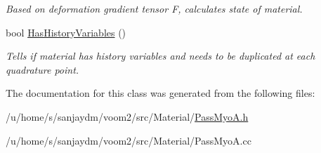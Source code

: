 \begin{DoxyCompactItemize}
\begin{DoxyCompactList}\small\item\em Based on deformation gradient tensor F, calculates state of material. \item\end{DoxyCompactList}\item 
\hypertarget{classvoom_1_1_pass_myo_a_a06cf31fdeb3e84c3aa7553928bcf3b01}{
bool \hyperlink{classvoom_1_1_pass_myo_a_a06cf31fdeb3e84c3aa7553928bcf3b01}{HasHistoryVariables} ()}
\label{classvoom_1_1_pass_myo_a_a06cf31fdeb3e84c3aa7553928bcf3b01}

\begin{DoxyCompactList}\small\item\em Tells if material has history variables and needs to be duplicated at each quadrature point. \item\end{DoxyCompactList}\end{DoxyCompactItemize}


The documentation for this class was generated from the following files:\begin{DoxyCompactItemize}
\item 
/u/home/s/sanjaydm/voom2/src/Material/\hyperlink{_pass_myo_a_8h}{PassMyoA.h}\item 
/u/home/s/sanjaydm/voom2/src/Material/PassMyoA.cc\end{DoxyCompactItemize}
